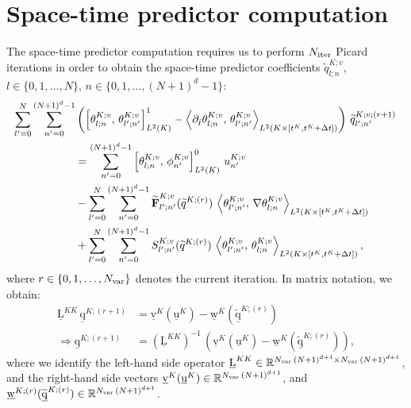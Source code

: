 \documentclass{scrreprt}
\theoremstyle{definition}
\theoremstyle{nonumberplain}
\renewcommand{\vec}[1]{{\textbf{#1}}}
\newcommand{\stvec}[1]{\widetilde{\vec{#1}}}
\newcommand{\laVec}[1]{\underline{\mathrm{#1}}}
\newcommand{\laMat}[1]{\underline{\mathrm{#1}}}
\newcommand{\cell}{K}
\begin{document}
\section{Space-time predictor computation}
The space-time predictor computation requires us to
perform $N_\textup{iter}$ Picard iterations in order
to obtain the space-time predictor
coefficients
$\widetilde{q}^{K;v}_{l;n}$,
$l\in\{0,1,\ldots,N\}$,
$n\in\{0,1,\ldots,(N+1)^{d}-1\}$:
\begin{align}
\sum_{l'=0}^{N}
\sum_{n'=0}^{(N+1)^{d}-1}
&\left(\left[\theta^{\cell;v}_{l;n},\,\theta^{\cell;v}_{l';n'}\right]^{1}_{L^2(\cell)}
-
\left\langle
\partial_{\hat{t}}\theta^{\cell;v}_{l;n},\,
\theta^{\cell;v}_{l';n'}
\right\rangle
_{L^2(\cell\times[t^\cell,t^\cell+\Delta t])}\right)
\,\widetilde{q}^{K;v;(r+1)}_{l';n'}\,
\notag
\\
&=\sum_{n'=0}^{(N+1)^{d}-1}
\left[\theta^{\cell;v}_{l;n},\,\phi^{\cell;v}_{n'}\right]^{0}_{L^2(\cell)}
\,
u^{\cell;v}_{n'}
\notag
\\
&-
\sum_{l'=0}^{N}
\sum_{n'=0}^{(N+1)^d-1}
\stvec{F}^{\cell;v}_{l';n'}
(\widetilde{q}^{\cell;(r)})
\,
\left\langle
\theta^{\cell;v}_{l';n'},\,
\nabla
\theta^{\cell;v}_{l;n}
\right\rangle
_{L^2(\cell\times[t^\cell,t^\cell+\Delta t])}
\\
&+
\sum_{l'=0}^{N}
\sum_{n'=0}^{(N+1)^d-1}
S^{\cell;v}_{l';n'}
(\widetilde{q}^{\cell;(r)})
\,
\left\langle
\theta^{\cell;v}_{l';n'},\,
\theta^{\cell;v}_{l;n}
\right\rangle
_{L^2(\cell\times[t^\cell,t^\cell+\Delta t])}
,
\end{align}
where $r\in\{0,1,\ldots,N_\textup{var}\}$ denotes the
current iteration.
In matrix notation, we obtain:
\begin{align}
\laVec{L}^{\cell\cell}\,\laVec{q}^{\cell;(r+1)}
&=
\laVec{v}^{K}(\laVec{u}^{\cell})-\laVec{w}^{K}(\widetilde{\laVec{q}}^{\cell;(r)})
\\
\Rightarrow
\laVec{q}^{\cell;(r+1)}
&=
{(\laVec{L}^{\cell\cell})}^{-1}\,
\left(
\laVec{v}^{K}(\laVec{u}^{\cell})-\laVec{w}^{K}(\widetilde{\laVec{q}}^{\cell;(r)})
\right)
,
\end{align}
where we identify the left-hand side operator
$\laMat{L}^{\cell\cell}\in\mathbb{R}^{N_\textup{var}\,(N+1)^{d+1}\times
N_\textup{var}\,(N+1)^{d+1}}$, and the right-hand side vectors
$\laVec{v}^{\cell}(\laVec{u}^{\cell})\in\mathbb{R}^{N_\textup{var}\,(N+1)^{d+1}}$,
and
$\laVec{w}^{\cell;(r)}(\widetilde{\laVec{q}}^{\cell;(r)})\in\mathbb{R}^{N_\textup{var}\,(N+1)^{d+1}}$.
\end{document}
